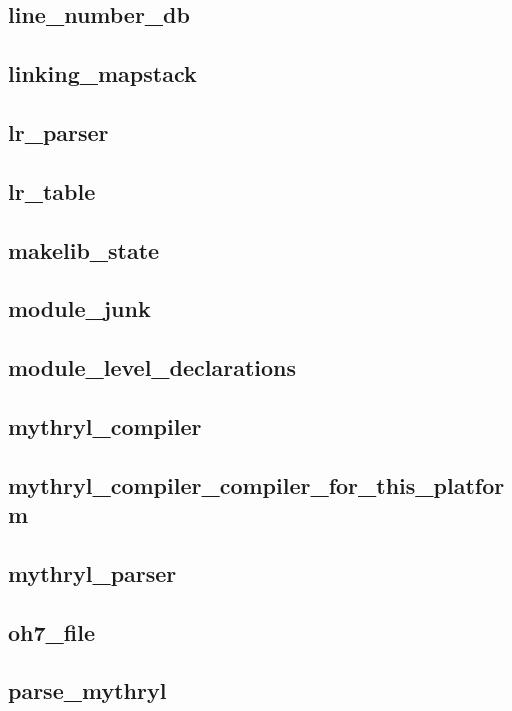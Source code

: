 \subsection{line\_number\_db}					
\subsection{linking\_mapstack}					
\subsection{lr\_parser}						
\subsection{lr\_table}						
\subsection{makelib\_state}					
\subsection{module\_junk}					
\subsection{module\_level\_declarations}			
\subsection{mythryl\_compiler}					
\subsection{mythryl\_compiler\_compiler\_for\_this\_platform}	
\subsection{mythryl\_parser}					
\subsection{oh7\_file}						
\subsection{parse\_mythryl}					
